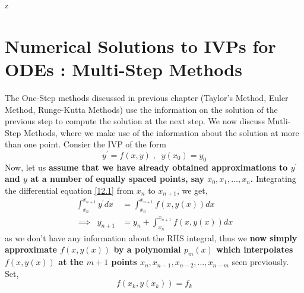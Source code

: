 z\documentclass[a4paper,12pt,twoside]{book}
\newcommand{\nll}[0]{\newline\newline}
\renewcommand{\d}[0]{\prime}
\begin{document}
\chapter{Numerical Solutions to IVPs for ODEs : Multi-Step Methods}
The One-Step methods discussed in previous chapter (Taylor's Method, Euler Method, Runge-Kutta Methods) use the information on the solution of the previous step to compute the solution at the next step. We now discuss Mutli-Step Methods, where we make use of the information about the solution at more than one point.
\nll
Consier the IVP of the form
\begin{equation}
\label{12.1}
    y^\d = f(x,y) \;,\;\; y(x_0) = y_0
\end{equation}
Now, let us \textbf{assume that we have already obtained approximations to $y^\d$ and $y$ at a number of equally spaced points, say $x_0,x_1,\dots,x_n$.} Integrating the differential equation \ref{12.1} from $x_n$ to $x_{n+1}$, we get,
\begin{equation}
\label{12.2}
    \begin{split}
        \int_{x_n}^{x_{n+1}} y^\d dx &= \int_{x_n}^{x_{n+1}} f(x,y(x))dx\\
        \implies\;\;y_{n+1} &= y_n + \int_{x_n}^{x_{n+1}} f(x,y(x))dx
    \end{split}
\end{equation}
as we don't have any information about the RHS integral, thus we\textbf{ now simply approximate $f(x,y(x))$ by a polynomial $p_m(x)$ which interpolates $f(x,y(x))$ at the $m+1$ points $x_n, x_{n-1}, x_{n-2}, \dots, x_{n-m}$} seen previously. Set,
\[f(x_k, y(x_k)) = f_k\]
\end{document}
